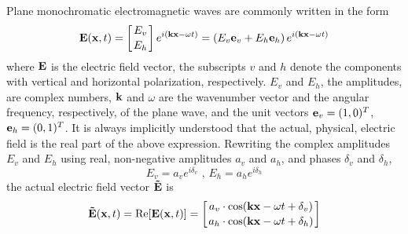 Plane monochromatic electromagnetic waves are commonly written in the form
\begin{equation} 
  \label{eq:polarization:e_field}
  \mathbf{E}(\mathbf{x},t) 
   = \left[E_v \atop E_h\right] e^{i(\mathbf{k}\mathbf{x} - \omega t)}
   = \left(E_v \mathbf{e}_v +  E_h \mathbf{e}_h \right) 
      e^{i(\mathbf{k}\mathbf{x} - \omega t)}
\end{equation}
where $\mathbf{E}$ is the electric field vector, the subscripts $v$
and $h$ denote the components with vertical and horizontal
polarization, respectively. $E_v$ and $E_h$, the amplitudes, are
complex numbers, $\mathbf{k}$ and $\omega$ are the wavenumber vector
and the angular frequency, respectively, of the plane wave, and the
unit vectors $\mathbf{e}_v = (1,0)^T$, $\mathbf{e}_h = (0,1)^T$.  It is always
implicitly understood that the actual, physical, electric field is the
real part of the above expression. Rewriting the complex amplitudes
$E_v$ and $E_h$ using real, non-negative amplitudes $a_v$ and $a_h$, and
phases $\delta_v$ and $\delta_h$,
\begin{equation}
  \label{eq:polarization:compl_ampl}
  E_v=a_v e^{i\delta_v}\mbox{ , }
  E_h=a_h e^{i\delta_h}
\end{equation}
the actual electric field vector $\mathbf{\tilde{E}}$ is
\begin{equation}
  \label{eq:polarization:actual_efield}
  \mathbf{\tilde{E}}(\mathbf{x},t) = \mathrm{Re}[\mathbf{E}(\mathbf{x},t)] 
    = \left[a_v\cdot \cos(\mathbf{k}\mathbf{x} - \omega t + \delta_v) 
                       \atop 
            a_h\cdot \cos(\mathbf{k}\mathbf{x} - \omega t + \delta_h) 
       \right] 
\end{equation}

